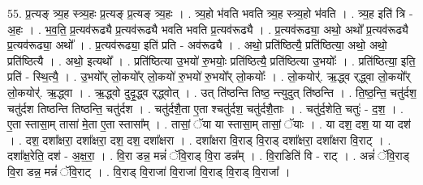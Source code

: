 \documentclass[17pt]{extarticle}
\begin{document}
55. प्र॒त्यङ् त्र्य॒ह स्त्र्य॒हः प्र॒त्यङ् प्र॒त्यङ् त्र्य॒हः । . त्र्य॒हो भ॑वति भवति त्र्य॒ह स्त्र्य॒हो भ॑वति । . त्र्य॒ह इति॑ त्रि - अ॒हः । . भ॒व॒ति॒ प्र॒त्यव॑रूढ्यै प्र॒त्यव॑रूढ्यै भवति भवति प्र॒त्यव॑रूढ्यै । . प्र॒त्यव॑रूढ्या॒ अथो॒ अथो᳚ प्र॒त्यव॑रूढ्यै प्र॒त्यव॑रूढ्या॒ अथो᳚ । . प्र॒त्यव॑रूढ्या॒ इति॑ प्रति - अव॑रूढ्यै । . अथो॒ प्रति॑ष्ठित्यै॒ प्रति॑ष्ठित्या॒ अथो॒ अथो॒ प्रति॑ष्ठित्यै । . अथो॒ इत्यथो᳚ । . प्रति॑ष्ठित्या उ॒भयो॑ रु॒भयोः॒ प्रति॑ष्ठित्यै॒ प्रति॑ष्ठित्या उ॒भयोः᳚ । . प्रति॑ष्ठित्या॒ इति॒ प्रति॑ - स्थि॒त्यै॒ । . उ॒भयो᳚र् लो॒कयो᳚र् लो॒कयो॑ रु॒भयो॑ रु॒भयो᳚र् लो॒कयोः᳚ । . लो॒कयोर्॑. ऋ॒द्ध्व र्‌द्ध्वा लो॒कयो᳚र् लो॒कयोर्॑. ऋ॒द्ध्वा । . ऋ॒द्ध्वो दुदृ॒द्ध्व र्‌द्ध्वोत् । . उत् ति॑ष्ठन्ति तिष्ठ॒ न्त्युदुत् ति॑ष्ठन्ति । . ति॒ष्ठ॒न्ति॒ चतु॑र्दश॒ चतु॑र्दश तिष्ठन्ति तिष्ठन्ति॒ चतु॑र्दश । . चतु॑र्दशै॒ता ए॒ता श्चतु॑र्दश॒ चतु॑र्दशै॒ताः । . चतु॑र्द॒शेति॒ चतुः॑ - द॒श॒ । . ए॒ता स्तासा॒म् तासा॑ मे॒ता ए॒ता स्तासा᳚म् । . तासां॒ ॅया या स्तासा॒म् तासां॒ ॅयाः । . या दश॒ दश॒ या या दश॑ । . दश॒ दशा᳚क्षरा॒ दशा᳚क्षरा॒ दश॒ दश॒ दशा᳚क्षरा । . दशा᳚क्षरा वि॒राड् वि॒राड् दशा᳚क्षरा॒ दशा᳚क्षरा वि॒राट् । . दशा᳚क्ष॒रेति॒ दश॑ - अ॒क्ष॒रा॒ । . वि॒रा डन्न॒ मन्नं॑ ॅवि॒राड् वि॒रा डन्न᳚म् । . वि॒राडिति॑ वि - राट् । . अन्नं॑ ॅवि॒राड् वि॒रा डन्न॒ मन्नं॑ ॅवि॒राट् । . वि॒राड् वि॒राजा॑ वि॒राजा॑ वि॒राड् वि॒राड् वि॒राजा᳚ । \newline
\end{document}
